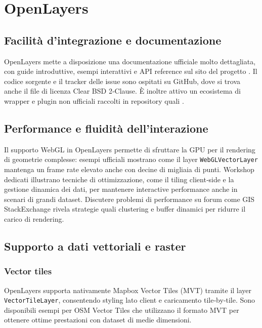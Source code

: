 \section{OpenLayers}
\label{ch:openlayers}

\subsection{Facilità d'integrazione e documentazione}
OpenLayers mette a disposizione una documentazione ufficiale molto dettagliata,
con guide introduttive, esempi interattivi e API reference sul sito del progetto
\cite{openlayers-doc}. Il codice sorgente e il tracker delle issue sono ospitati
su GitHub, dove si trova anche il file di licenza Clear BSD 2‑Clause. È inoltre
attivo un ecosistema di wrapper e plugin non ufficiali raccolti in repository
quali  \cite{openlayers-github,awesome-openlayers}.

\subsection{Performance e fluidità dell'interazione}
Il supporto WebGL in OpenLayers permette di sfruttare la GPU per il rendering di
geometrie complesse: esempi ufficiali mostrano come il layer \texttt{WebGLVectorLayer}
mantenga un frame rate elevato anche con decine di migliaia di punti.
\cite{openlayers-webgl-example} Workshop dedicati illustrano tecniche di
ottimizzazione, come il tiling client‑side e la gestione dinamica dei dati, per
mantenere interactive performance anche in scenari di grandi dataset. Discutere problemi
di performance su forum come GIS StackExchange rivela strategie quali clustering
e buffer dinamici per ridurre il carico di rendering.
\cite{openlayers-webgl-workshop,openlayers-issue-perf}

\subsection{Supporto a dati vettoriali e raster}
\subsubsection*{Vector tiles}
OpenLayers supporta nativamente Mapbox Vector Tiles (MVT) tramite il layer \texttt{VectorTileLayer},
consentendo styling lato client e caricamento tile‑by‑tile. Sono disponibili
esempi per OSM Vector Tiles che utilizzano il formato MVT per ottenere ottime
prestazioni con dataset di medie dimensioni. \cite{openlayers-mapbox-vector-tiles,openlayers-osm-vector-tiles}

